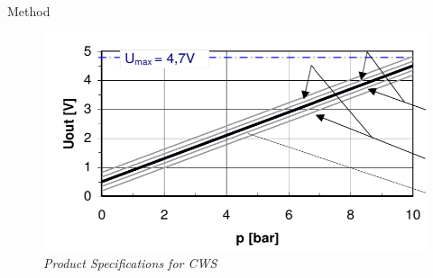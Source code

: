 \documentclass[8pt,compress,aspectratio=169]{beamer}
\begin{document}
\begin{frame}
\begin{minipage}{0.485\textwidth}
\begin{block}{Method}
{\begin{enumerate}
                \end{enumerate}
            }
        \end{block}
    \end{minipage}
    \hfill
    \begin{minipage}{0.50\textwidth}
        \begin{figure}
            \centering
            \includegraphics[width=\textwidth]{assets/specs/adc_product_specs.png}
            \caption{\it Product Specifications for CWS}
        \end{figure}
        \vspace{0.2cm}
    \end{minipage}
\end{frame}

\end{document}
